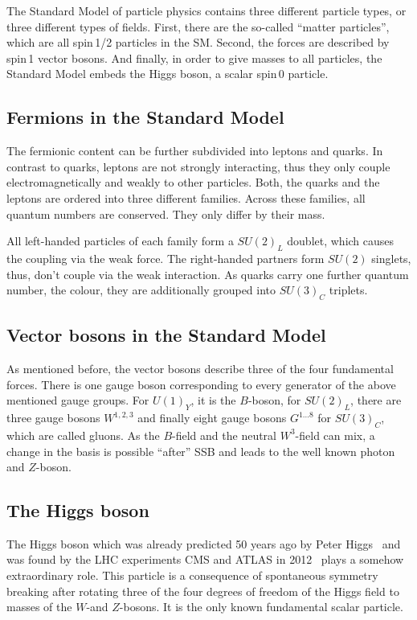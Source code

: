 The Standard Model of particle physics contains three different particle types, or three different types of fields.
First, there are the so-called ``matter particles'', which are all spin\,1/2 particles in the SM.
Second, the forces are described by spin\,1 vector bosons.
And finally, in order to give masses to all particles, the Standard Model embeds the Higgs boson, a scalar spin\,0 particle.

\subsection*{Fermions in the Standard Model}
The fermionic content can be further subdivided into leptons and quarks.
In contrast to quarks, leptons are not strongly interacting, thus they only couple electromagnetically and weakly to other particles.
Both, the quarks and the leptons are ordered into three different families.
Across these families, all quantum numbers are conserved.
They only differ by their mass.

All left-handed particles of each family form a $SU(2)_L$ doublet, which causes the coupling via the weak force.
The right-handed partners form $SU(2)$ singlets, thus, don't couple via the weak interaction.
As quarks carry one further quantum number, the colour, they are additionally grouped into $SU(3)_C$ triplets.

\subsection*{Vector bosons in the Standard Model}
As mentioned before, the vector bosons describe three of the four fundamental forces.
There is one gauge boson corresponding to every generator of the above mentioned gauge groups.
For $U(1)_Y$, it is the $B$-boson, for $SU(2)_L$, there are three gauge bosons $W^{1,2,3}$ and finally eight gauge bosons $G^{1...8}$ for $SU(3)_C$, which are called gluons.
As the $B$-field and the neutral $W^3$-field can mix, a change in the basis is possible ``after'' SSB and leads to the well known photon and $Z$-boson.

\subsection*{The Higgs boson}
The Higgs boson which was already predicted 50 years ago by Peter Higgs~\cite{bib:Higgs_Prediction,bib:Higgs_Prediction_2} and was found by the LHC experiments CMS and ATLAS in 2012~\cite{bib:Theory:CMS:HiggsObservation,bib:Theory:Atlas:HiggsObservation} plays a somehow extraordinary role.
This particle is a consequence of spontaneous symmetry breaking after rotating three of the four degrees of freedom of the Higgs field to masses of the $W$-and $Z$-bosons.
It is the only known fundamental scalar particle.\\


